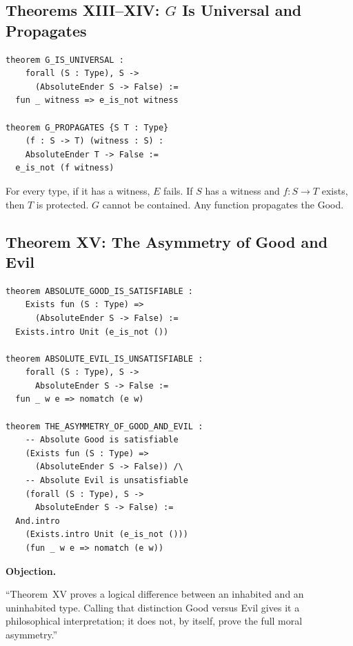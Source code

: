 \documentclass[12pt,a4paper]{article}
\newenvironment{objection}{%
  \par\medskip\noindent
  \textbf{\color{red!60!black}Objection.}\itshape\space
}{%
  \par\medskip
}
\begin{document}
\subsection{Theorems XIII--XIV: $G$ Is Universal and Propagates}

\begin{lstlisting}
theorem G_IS_UNIVERSAL :
    forall (S : Type), S ->
      (AbsoluteEnder S -> False) :=
  fun _ witness => e_is_not witness

theorem G_PROPAGATES {S T : Type}
    (f : S -> T) (witness : S) :
    AbsoluteEnder T -> False :=
  e_is_not (f witness)
\end{lstlisting}

For every type, if it has a witness, $E$ fails. If $S$ has a witness and
$f : S \to T$ exists, then $T$ is protected. $G$ cannot be contained.
Any function propagates the Good.

\subsection{Theorem XV: The Asymmetry of Good and Evil}

\begin{lstlisting}
theorem ABSOLUTE_GOOD_IS_SATISFIABLE :
    Exists fun (S : Type) =>
      (AbsoluteEnder S -> False) :=
  Exists.intro Unit (e_is_not ())

theorem ABSOLUTE_EVIL_IS_UNSATISFIABLE :
    forall (S : Type), S ->
      AbsoluteEnder S -> False :=
  fun _ w e => nomatch (e w)

theorem THE_ASYMMETRY_OF_GOOD_AND_EVIL :
    -- Absolute Good is satisfiable
    (Exists fun (S : Type) =>
      (AbsoluteEnder S -> False)) /\
    -- Absolute Evil is unsatisfiable
    (forall (S : Type), S ->
      AbsoluteEnder S -> False) :=
  And.intro
    (Exists.intro Unit (e_is_not ()))
    (fun _ w e => nomatch (e w))
\end{lstlisting}

\begin{objection}
``Theorem~XV proves a logical difference between an inhabited and an
uninhabited type. Calling that distinction Good versus Evil gives it a
philosophical interpretation; it does not, by itself, prove the full
moral asymmetry.''
\end{objection}
\end{document}
